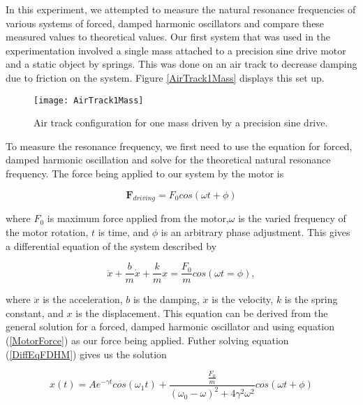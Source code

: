 \par In this experiment, we attempted to measure the natural resonance frequencies of various systems of forced, damped harmonic oscillators and compare these measured values to theoretical values. Our first system that was used in the experimentation involved a single mass attached to a precision sine drive motor and a static object by springs. This was done on an air track to decrease damping due to friction on the system. Figure \ref{AirTrack1Mass} displays this set up.

\begin{figure}[h]
\centering
\texttt{[image: AirTrack1Mass]}
\caption{Air track configuration for one mass driven by a precision sine drive.}
\label{figure:AirTrack1Mass}
\end{figure}

\par To measure the resonance frequency, we first need to use the equation for forced, damped harmonic oscillation and solve for the theoretical natural resonance frequency. The force being applied to our system by the motor is

\begin{equation}
\textbf{F}_{driving} = F_0 cos(\omega t + \phi)
\label{eq:MotorForce}
\end{equation}

where $F_0$ is maximum force applied from the motor,$\omega$ is the varied frequency of the motor rotation, $t$ is time, and $\phi$ is an arbitrary phase adjustment. This gives a differential equation of the system described by

\begin{equation}
\ddot{x} + \frac{b}{m}\dot{x} + \frac{k}{m}x = \frac{F_0}{m} cos(\omega t = \phi) ,
\label{eq:DiffEqFDHM}
\end{equation}

where $\ddot{x}$ is the acceleration, $b$ is the damping, $\dot{x}$ is the velocity, $k$ is the spring constant, and $x$ is the displacement. This equation can be derived from the  general solution for a forced, damped harmonic oscillator and using equation (\ref{MotorForce}) as our force being applied. Futher solving equation (\ref{DiffEqFDHM}) gives us the solution

\begin{equation}
x(t) = Ae^{- \gamma t} cos( \omega_1 t) + \frac{\frac{F_0}{m}}{(\omega_0 - \omega)^2 + 4 \gamma^2 \omega^2} cos(\omega t + \phi)
\label{eq:solution1cart}
\end{equation}

